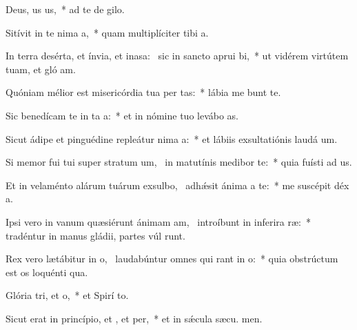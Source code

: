\item Deus, us us,~* ad te de  gilo.
\item Sitívit in te nima a,~* quam multiplíciter tibi  a.
\item In terra desérta, et ínvia, et inasa:~\pscross{} sic in sancto aprui bi,~* ut vidérem virtútem tuam, et gló am.
\item Quóniam mélior est misericórdia tua per tas:~* lábia me bunt te.
\item Sic benedícam te in ta a:~* et in nómine tuo levábo  as.
\item Sicut ádipe et pinguédine repleátur nima a:~* et lábiis exsultatiónis laudá  um.
\item Si memor fui tui super stratum um,~\pscross{} in matutínis medibor  te:~* quia fuísti ad us.
\item Et in velaménto alárum tuárum exsulbo,~\pscross{} adhǽsit ánima a  te:~* me suscépit déx a.
\item Ipsi vero in vanum quæsiérunt ánimam am,~\pscross{} introíbunt in inferira ræ:~* tradéntur in manus gládii, partes vúl runt.
\item Rex vero lætábitur in o,~\pscross{} laudabúntur omnes qui rant in o:~* quia obstrúctum est os loquénti qua.
\item Glória tri, et o,~* et Spirí to.
\item Sicut erat in princípio, et , et per,~* et in sǽcula sæcu. men.
